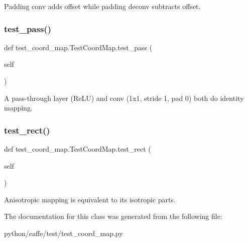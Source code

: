\begin{DoxyVerb}Padding conv adds offset while padding deconv subtracts offset.
\end{DoxyVerb}
 \mbox{\label{classtest__coord__map_1_1_test_coord_map_a2f0683f7bed6336b447db17df3402ba1}} 
\subsubsection{\texorpdfstring{test\+\_\+pass()}{test\_pass()}}
{\footnotesize\ttfamily def test\+\_\+coord\+\_\+map.\+Test\+Coord\+Map.\+test\+\_\+pass (\begin{DoxyParamCaption}\item[{}]{self }\end{DoxyParamCaption})}

\begin{DoxyVerb}A pass-through layer (ReLU) and conv (1x1, stride 1, pad 0)
both do identity mapping.
\end{DoxyVerb}
 \mbox{\label{classtest__coord__map_1_1_test_coord_map_a8af3000e67e91408dcc1957e49f8490b}} 
\subsubsection{\texorpdfstring{test\+\_\+rect()}{test\_rect()}}
{\footnotesize\ttfamily def test\+\_\+coord\+\_\+map.\+Test\+Coord\+Map.\+test\+\_\+rect (\begin{DoxyParamCaption}\item[{}]{self }\end{DoxyParamCaption})}

\begin{DoxyVerb}Anisotropic mapping is equivalent to its isotropic parts.
\end{DoxyVerb}
 

The documentation for this class was generated from the following file\+:\begin{DoxyCompactItemize}
\item 
python/caffe/test/test\+\_\+coord\+\_\+map.\+py\end{DoxyCompactItemize}
